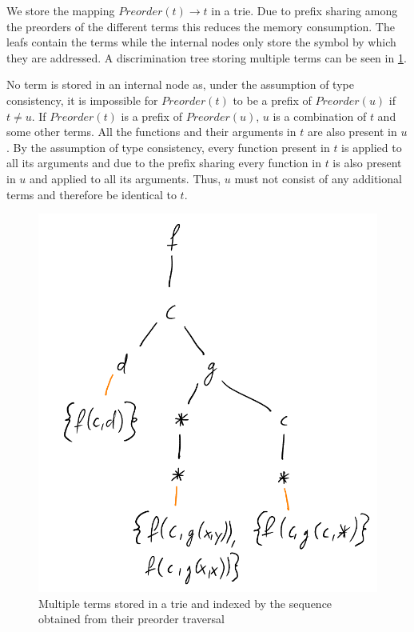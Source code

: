 We store the mapping $Preorder(t) \rightarrow t$ in a trie. Due to prefix sharing among the preorders of the different terms this reduces the memory consumption. The leafs contain the terms while the internal nodes only store the symbol by which they are addressed. A discrimination tree storing multiple terms can be seen in \ref{discnet}.

No term is stored in an internal node as, under the assumption of type consistency, it is impossible for $Preorder(t)$ to be a prefix of $Preorder(u)$ if $t \neq u$. If $Preorder(t)$ is a prefix of $Preorder(u)$, $u$ is a combination of $t$ and some other terms. All the functions and their arguments in $t$ are also present in $u$. By the assumption of type consistency, every function present in $t$ is applied to all its arguments and due to the prefix sharing every function in $t$ is also present in $u$ and applied to all its arguments. Thus, $u$ must not consist of any additional terms and therefore be identical to $t$.

\begin{figure}[h]
\centering
\includegraphics[scale=0.25]{figures/disc_net.png}
\caption{Multiple terms stored in a trie and indexed by the sequence obtained from their preorder traversal}
\label{discnet}
\end{figure}

